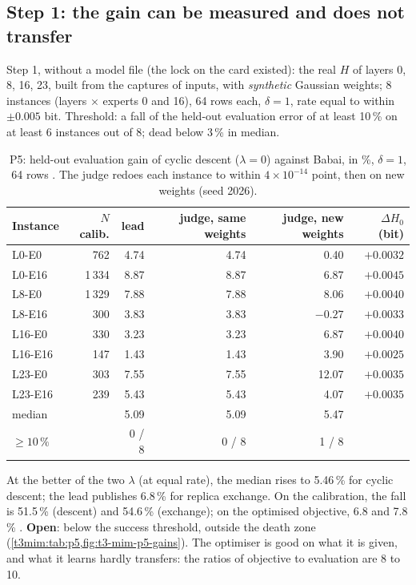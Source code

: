 \subsection{Step 1: the gain can be measured and does not transfer}\label{t3mim:sec:p5-etape1}

Step 1, without a model file (the lock on the card existed): the real $H$ of layers 0, 8, 16, 23, built from the captures of inputs, with \emph{synthetic} Gaussian weights; 8 instances (layers $\times$ experts 0 and 16), 64 rows each, $\delta = 1$, rate equal to within $\pm 0.005$ bit. Threshold: a fall of the held-out evaluation error of at least 10\,\% on at least 6 instances out of 8; dead below 3\,\% in median.

\begin{table}[tbp]
\centering\small
\caption[P5: gains of cyclic descent, lead and judge]{P5: held-out evaluation gain of cyclic descent ($\lambda = 0$) against Babai, in \%, $\delta = 1$, 64 rows \mes. The judge redoes each instance to within $4 \times 10^{-14}$ point, then on new weights (seed 2026).}
\label{t3mim:tab:p5}
\begin{tabular}{@{}lrrrrr@{}}
\toprule
Instance & $N$ calib. & lead & judge, same weights & judge, new weights & $\Delta H_0$ (bit) \\
\midrule
L0-E0 & 762 & 4.74 & 4.74 & 0.40 & $+0.0032$ \\
L0-E16 & 1\,334 & 8.87 & 8.87 & 6.87 & $+0.0045$ \\
L8-E0 & 1\,329 & 7.88 & 7.88 & 8.06 & $+0.0040$ \\
L8-E16 & 300 & 3.83 & 3.83 & $-0.27$ & $+0.0033$ \\
L16-E0 & 330 & 3.23 & 3.23 & 6.87 & $+0.0040$ \\
L16-E16 & 147 & 1.43 & 1.43 & 3.90 & $+0.0025$ \\
L23-E0 & 303 & 7.55 & 7.55 & 12.07 & $+0.0035$ \\
L23-E16 & 239 & 5.43 & 5.43 & 4.07 & $+0.0035$ \\
\midrule
median & & 5.09 & 5.09 & 5.47 & \\
$\ge 10\,\%$ & & 0 / 8 & 0 / 8 & 1 / 8 & \\
\bottomrule
\end{tabular}
\end{table}

At the better of the two $\lambda$ (at equal rate), the median rises to 5.46\,\% for cyclic descent; the lead publishes 6.8\,\% for replica exchange. On the calibration, the fall is 51.5\,\% (descent) and 54.6\,\% (exchange); on the optimised objective, 6.8 and 7.8\,\% \mes. \textbf{Open}: below the success threshold, outside the death zone (\cref{t3mim:tab:p5,fig:t3-mim-p5-gains}). The optimiser is good on what it is given, and what it learns hardly transfers: the ratios of objective to evaluation are 8 to 10.

